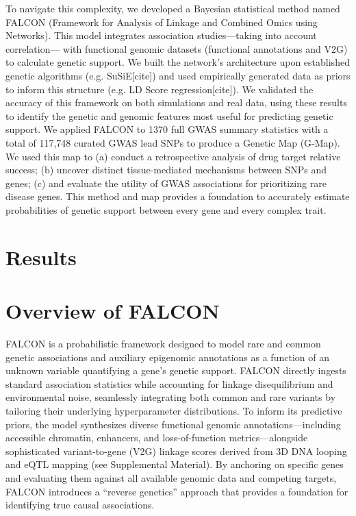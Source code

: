 To navigate this complexity, we developed a Bayesian statistical method named FALCON (Framework for Analysis of Linkage and Combined Omics using Networks). This model integrates association studies—taking into account correlation— with functional genomic datasets (functional annotations and V2G) to calculate genetic support. We built the network's architecture upon established genetic algorithms (e.g. SuSiE[cite]) and used empirically generated data as priors to inform this structure (e.g. LD Score regression[cite]). We validated the accuracy of this framework on both simulations and real data, using these results to identify the genetic and genomic features most useful for predicting genetic support. We applied FALCON to 1370 full GWAS summary statistics with a total of 117,748 curated GWAS lead SNPs to produce a Genetic Map (G-Map). We used this map to (a) conduct a retrospective analysis of drug target relative success; (b) uncover distinct tissue-mediated mechanisms between SNPs and genes; (c) and evaluate the utility of GWAS associations for prioritizing rare disease genes. This method and map provides a foundation to accurately estimate probabilities of genetic support between every gene and every complex trait.
\section{Results}
\label{sec:results}
\section{Overview of FALCON}
\label{sec:overview}
FALCON is a probabilistic framework designed to model rare and common genetic associations and auxiliary epigenomic annotations as a function of an unknown variable quantifying a gene’s genetic support. FALCON directly ingests standard association statistics while accounting for linkage disequilibrium and environmental noise, seamlessly integrating both common and rare variants by tailoring their underlying hyperparameter distributions. To inform its predictive priors, the model synthesizes diverse functional genomic annotations—including accessible chromatin, enhancers, and loss-of-function metrics—alongside sophisticated variant-to-gene (V2G) linkage scores derived from 3D DNA looping and eQTL mapping (see Supplemental Material). By anchoring on specific genes and evaluating them against all available genomic data and competing targets, FALCON introduces a “reverse genetics” approach that provides a foundation for identifying true causal associations.

